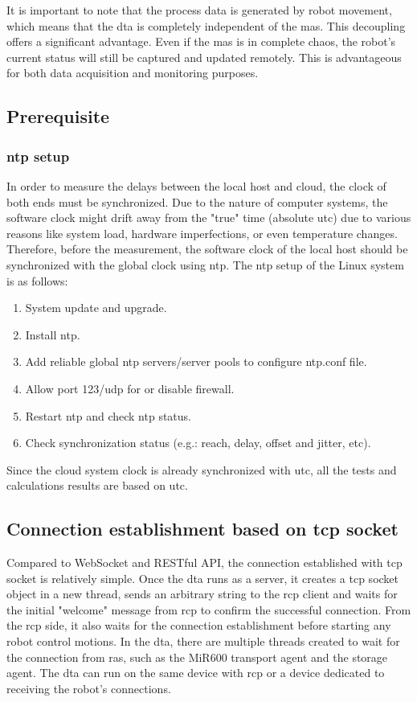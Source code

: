 It is important to note that the process data is generated by robot movement, 
which means that the \gls{dta} is completely independent of the \gls{mas}. This decoupling 
offers a 
significant advantage. Even if the \gls{mas} is in complete chaos, the robot's current status 
will still be captured and updated remotely. This is advantageous for both data acquisition 
and monitoring purposes.



\subsection{Prerequisite} \label{chap: ntpsetup}
\subsubsection{\gls{ntp} setup}
In order to measure the delays between the local host and cloud, the clock of both ends must be synchronized. 
Due to the nature of computer systems, the software clock might drift away from the "true" time (absolute \gls{utc}) 
due to various reasons like system load, hardware imperfections, or even temperature changes.
Therefore, before the measurement, the software clock of the local host should be synchronized with the global 
clock using \gls{ntp}. 
The \gls{ntp} setup of the Linux system is as follows:  

\begin{enumerate}
    \item System update and upgrade.
    \item Install \gls{ntp}.
    \item Add reliable global \gls{ntp} servers/server pools to configure ntp.conf file.
    \item Allow port 123/udp for or disable firewall.
    \item Restart \gls{ntp} and check \gls{ntp} status.
    \item Check synchronization status (e.g.: reach, delay, offset and jitter, etc).
    \end{enumerate}

Since the cloud system clock is already synchronized with \gls{utc}, all the tests and calculations results are based on \gls{utc}. 


\subsection{Connection establishment based on \gls{tcp} socket} \label{chap: tcpsocket}
Compared to WebSocket and RESTful API, the connection established with \gls{tcp} 
socket is relatively simple. Once the \gls{dta} runs as a server, it creates a \gls{tcp} socket 
object in a new thread, sends an arbitrary string to the \gls{rcp} client and 
waits for the initial "welcome" message from \gls{rcp} 
to confirm the successful connection. 
From the \gls{rcp} side, it also waits for the connection establishment before 
starting any robot control motions.  
In the \gls{dta}, there are multiple threads created to wait for the connection 
from \gls{ras}, such as the MiR600 transport agent and the storage agent. 
The \gls{dta} can run on the same device with \gls{rcp} or a device dedicated 
to receiving the robot's connections. 

